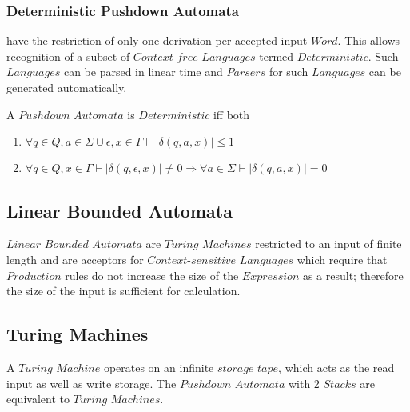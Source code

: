 \documentclass{article}
\begin{document}
\subsubsection{Deterministic Pushdown Automata} have the
restriction of only one derivation per accepted input $Word$. This
allows recognition of a subset of $Context$-$free$ $Languages$ termed
$Deterministic$. Such $Languages$ can be parsed in linear time and
$Parsers$ for such $Languages$ can be generated automatically.

A $Pushdown$ $Automata$ is $Deterministic$ iff both
\begin{enumerate}
\item $\forall q \in Q, a \in \Sigma \cup {\epsilon}, x \in
  \Gamma \vdash |\delta(q,a,x)| \leq 1$
\item $\forall q \in Q, x \in \Gamma \vdash |\delta(q,\epsilon,x)|
  \neq 0 \Rightarrow \forall a \in \Sigma \vdash |\delta(q,a,x)|=0$
\end{enumerate}

\subsection{Linear Bounded Automata} \label{subsec:linear_bounded_automata}
$Linear$ $Bounded$ $Automata$ are $Turing$ $Machines$ restricted to an
input of finite length and are acceptors for $Context$-$sensitive$
$Languages$ which require that $Production$ rules do not increase the
size of the $Expression$ as a result; therefore the size of the input
is sufficient for calculation.

\subsection{Turing Machines}
A $Turing$ $Machine$ operates on an infinite $storage$ $tape$, which
acts as the read input as well as write storage. The $Pushdown$
$Automata$ with 2 $Stacks$ are equivalent to $Turing$ $Machines$.
\end{document}
